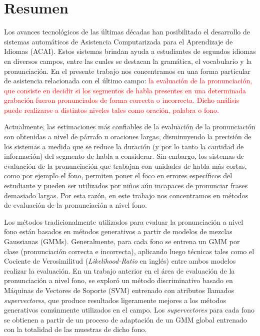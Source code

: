 \chapter*{Resumen}

Los avances tecnol\'{o}gicos de las \'{u}ltimas d\'{e}cadas han
posibilitado el desarrollo de sistemas
autom\'{a}ticos de Asistencia Computarizada para el Aprendizaje de Idiomas (ACAI).
Estos sistemas brindan ayuda a estudiantes de segundos idiomas
en diversos campos, entre las cuales se destacan la gram\'{a}tica, el vocabulario
y la pronunciaci\'{o}n. En el presente trabajo nos concentramos en una forma
particular de asistencia relacionada con el \'{u}ltimo campo:
\textcolor{red}{
la evaluaci\'{o}n
de la pronunciaci\'{o}n, que consiste en decidir si los segmentos de habla presentes
en una determinada
grabaci\'{o}n fueron pronunciados de forma correcta o incorrecta. Dicho an\'{a}lisis
puede realizarse a distintos niveles tales como oraci\'{o}n, palabra o fono.
}

Actualmente, las estimaciones m\'{a}s confiables de la evaluaci\'{o}n de la pronunciaci\'{o}n
son obtenidas a nivel de p\'{a}rrafo u oraciones largas, disminuyendo la precisi\'{o}n
de los sistemas a medida que se reduce la duraci\'{o}n
(y por lo tanto la cantidad de informaci\'{o}n) del segmento de habla a considerar.
Sin embargo, los sistemas de evaluaci\'{o}n de la pronunciaci\'{o}n
que trabajan con unidades de habla
m\'{a}s cortas, como por ejemplo el fono,
permiten poner el foco en errores espec\'{i}ficos del estudiante y
pueden ser utilizados por ni\~nos a\'{u}n incapaces de pronunciar frases
demasiado largas. Por esta raz\'{o}n,
en este trabajo nos concentramos en m\'{e}todos de evaluaci\'{o}n de la pronunciaci\'{o}n
a nivel fono.

Los m\'{e}todos tradicionalmente utilizados para evaluar
la pronunciaci\'{o}n a nivel fono
est\'{a}n basados en m\'{e}todos generativos a partir de
modelos de mezclas Gaussianas (GMMs). Generalmente,
para cada fono se
entrena un GMM por clase (pronunciaci\'{o}n correcta e incorrecta),
aplicando luego t\'{e}cnicas tales como el Cociente de
Verosimilitud (\textit{Likelihood-Ratio} en ingl\'{e}s) entre ambos modelos realizar
la evaluaci\'{o}n. En un trabajo anterior en
el \'{a}rea de evaluaci\'{o}n de la pronunciaci\'{o}n a nivel fono,
se explor\'{o}
un m\'{e}todo discriminativo basado en M\'{a}quinas de Vectores de Soporte (SVM) entrenado
con atributos llamados \textit{supervectores}, que produce resultados
ligeramente mejores a los m\'{e}todos generativos com\'{u}nmente utilizados en el campo.
Los \textit{supervectores} para cada fono se obtienen
a partir de un proceso de adaptaci\'{o}n de un
GMM global entrenado con la totalidad
de las muestras de dicho fono.


